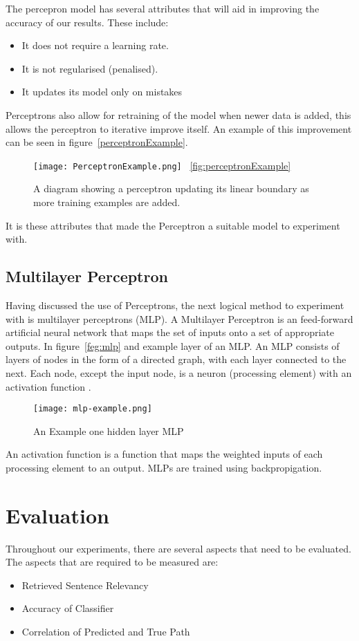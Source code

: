 \documentclass[bsc,frontabs,twoside,singlespacing,parskip,deptreport]{infthesis}     %
\begin{document}
The percepron model has several attributes that will aid in improving the accuracy of our results.
These include:
\begin{itemize}
\item It does not require a learning rate.
\item It is not regularised (penalised).
\item It updates its model only on mistakes
\end{itemize}

Perceptrons also allow for retraining of the model when newer data is added, this allows the perceptron to
iterative improve itself. An example of this improvement can be seen in figure~\ref{perceptronExample}.
\begin{figure}[ht]
  \centering
  \texttt{[image: PerceptronExample.png]}
 ~\ref{fig:perceptronExample}
  \caption{A diagram showing a perceptron updating its linear boundary as more training examples are added. }
\end{figure}


It is these attributes that made the Perceptron a suitable model to experiment with.
\subsection{Multilayer Perceptron}
Having discussed the use of Perceptrons, the next logical method to experiment with is multilayer perceptrons (MLP).
A Multilayer Perceptron is an feed-forward artificial neural network that maps the set of inputs
onto a set of appropriate outputs.
In figure~\ref{feg:mlp} and example layer of an MLP.
An MLP consists of layers of  nodes in the form of a directed graph, with each layer connected to the next.
Each node, except the input node, is a neuron (processing element) with an activation function \cite{}.%

\begin{figure}
  \centering
  \texttt{[image: mlp-example.png]}
  \caption{An Example one hidden layer MLP \cite{scikit-learn}}
  \label{fig:mlp}
\end{figure}

An activation function is a function that maps the weighted inputs of each processing element to an output.
MLPs are trained using backpropigation.

\section{Evaluation}
Throughout our experiments, there are several aspects that need to be evaluated.
The aspects that are required to be measured are:
\begin{itemize}
  \item Retrieved Sentence Relevancy
  \item Accuracy of Classifier
  \item Correlation of Predicted and True Path
\end{itemize}
\end{document}
